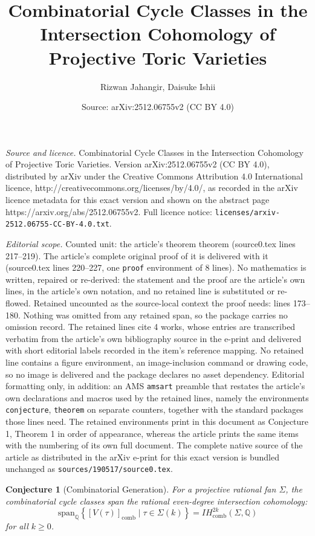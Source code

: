 \documentclass[10pt,a4paper]{amsart}
\title{Combinatorial Cycle Classes in the Intersection Cohomology of Projective Toric Varieties}
\author{Rizwan Jahangir, Daisuke Ishii}
\date{Source: arXiv:2512.06755v2 (CC BY 4.0)}
\newtheorem{conjecture}{Conjecture}
\newcommand{\IHcomb}{IH_{\mathrm{comb}}}
\newcommand{\IQ}{\mathbb{Q}}
\newcommand{\SigmaFan}{\Sigma}
\begin{document}
\maketitle

\noindent\emph{Source and licence.} Combinatorial Cycle Classes in the Intersection Cohomology of Projective Toric Varieties. Version arXiv:2512.06755v2 (CC BY 4.0), distributed by arXiv under the Creative Commons Attribution 4.0 International licence, http://creativecommons.org/licenses/by/4.0/, as recorded in the arXiv licence metadata for this exact version and shown on the abstract page https://arxiv.org/abs/2512.06755v2. Full licence notice: \texttt{licenses/arxiv-2512.06755-CC-BY-4.0.txt}.\par\smallskip

\noindent\textit{Editorial scope.} Counted unit: the article's theorem theorem (source0.tex lines 217--219). The article's complete original proof of it is delivered with it (source0.tex lines 220--227, one \texttt{proof} environment of 8 lines). No mathematics is written, repaired or re-derived: the statement and the proof are the article's own lines, in the article's own notation, and no retained line is substituted or re-flowed.  Retained uncounted as the source-local context the proof needs: lines 173--180.  Nothing was omitted from any retained span, so the package carries no omission record.  The retained lines cite 4 works, whose entries are transcribed verbatim from the article's own bibliography source in the e-print and delivered with short editorial labels recorded in the item's reference mapping.  No retained line contains a figure environment, an image-inclusion command or drawing code, so no image is delivered and the package declares no asset dependency.  Editorial formatting only, in addition: an AMS \texttt{amsart} preamble that restates the article's own declarations and macros used by the retained lines, namely the environments \texttt{conjecture}, \texttt{theorem} on separate counters, together with the standard packages those lines need.  The retained environments print in this document as Conjecture 1, Theorem 1 in order of appearance, whereas the article prints the same items with the numbering of its own full document.  The complete native source of the article as distributed in the arXiv e-print for this exact version is bundled unchanged as \texttt{sources/190517/source0.tex}.
	\begin{conjecture}[Combinatorial Generation]
		\label{conj:generation}
		For a projective rational fan $\SigmaFan$, the combinatorial cycle classes span the rational even-degree intersection cohomology:
		\[
		\mathrm{span}_{\IQ}\left\{ [V(\tau)]_{\mathrm{comb}} \mid \tau \in \SigmaFan(k) \right\} = \IHcomb^{2k}(\SigmaFan, \IQ)
		\]
		for all $k \ge 0$.
	\end{conjecture}
\end{document}

